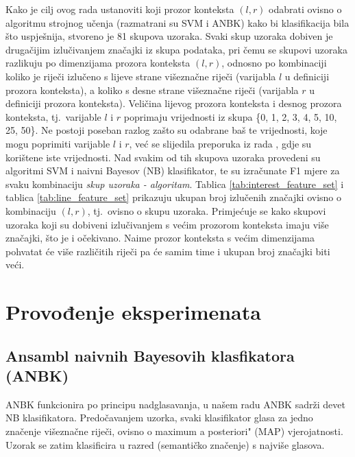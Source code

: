 \documentclass[10pt, a4paper]{article}
\begin{document}
Kako je cilj ovog rada ustanoviti koji prozor konteksta $(l,r)$ odabrati
ovisno o algoritmu strojnog učenja (razmatrani su SVM i ANBK)
kako bi klasifikacija bila što uspješnija, stvoreno je 81 skupova uzoraka. Svaki
skup uzoraka dobiven je drugačijim izlučivanjem značajki iz skupa podataka,
pri čemu se skupovi uzoraka razlikuju po dimenzijama prozora konteksta $(l, r)$,
odnosno po kombinaciji koliko je riječi izlučeno s lijeve strane višeznačne riječi (varijabla $l$ u definiciji prozora konteksta), a koliko s desne strane višeznačne riječi (varijabla $r$ u definiciji prozora konteksta). Veličina lijevog prozora konteksta i desnog prozora konteksta, tj.~varijable
$l$ i $r$ poprimaju vrijednosti iz skupa \{0, 1, 2, 3, 4, 5, 10, 25, 50\}. Ne postoji poseban
razlog zašto su odabrane baš te vrijednosti, koje mogu poprimiti varijable $l$ i $r$,
već se slijedila preporuka iz rada \citep{pedersen}, gdje su korištene iste vrijednosti.
Nad svakim od tih skupova uzoraka provedeni su algoritmi SVM i naivni Bayesov (NB) klasifikator, te su izračunate F1 mjere za svaku kombinaciju \emph{skup uzoraka - algoritam}.
Tablica \ref{tab:interest_feature_set} i tablica \ref{tab:line_feature_set} prikazuju ukupan broj izlučenih značajki ovisno o kombinaciju $(l,r)$, tj.~ovisno o skupu uzoraka. Primjećuje
se kako skupovi uzoraka koji su dobiveni izlučivanjem s većim prozorom konteksta imaju
više značajki, što je i očekivano. Naime prozor konteksta s većim dimenzijama pohvatat će više 
različitih riječi pa će samim time i ukupan broj značajki biti veći.

\section{Provođenje eksperimenata}
\subsection{Ansambl naivnih Bayesovih klasfikatora (ANBK)}
ANBK funkcionira po principu nadglasavanja, u našem radu ANBK sadrži devet NB klasifikatora.
Predočavanjem uzorka, svaki klasifikator glasa za jedno značenje višeznačne riječi, 
ovisno o \grqq maximum a posteriori" (MAP) vjerojatnosti. Uzorak se 
zatim klasificira u razred (semantičko značenje) s najviše glasova.
\end{document}
